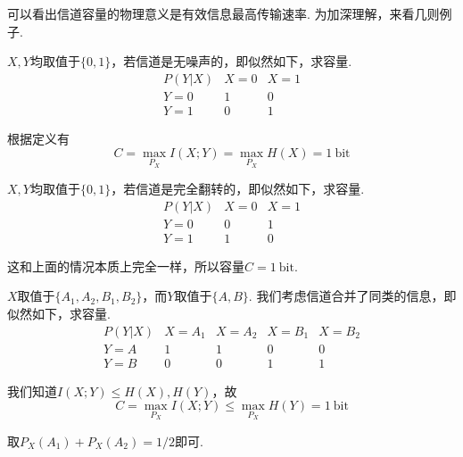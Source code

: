 可以看出信道容量的物理意义是有效信息最高传输速率. 为加深理解，来看几则例子. 
\begin{example}
    $X,Y$均取值于$\{0,1\}$，若信道是无噪声的，即似然如下，求容量.
    \[
    \begin{array}{c|c|c}
        P(Y|X) & X=0 & X=1 \\ \hline 
        Y=0 & 1 & 0 \\ \hline 
        Y=1 & 0 & 1        
    \end{array}
    \]
\end{example}
\begin{solution}根据定义有
    \[
        C = \max_{P_X} I(X;Y) = \max_{P_X} H(X) = 1 \ \text{bit}
    \]
\end{solution}

\begin{example}
    $X,Y$均取值于$\{0,1\}$，若信道是完全翻转的，即似然如下，求容量.
    \[
    \begin{array}{c|c|c}
        P(Y|X) & X=0 & X=1 \\ \hline 
        Y=0 & 0 & 1 \\ \hline 
        Y=1 & 1 & 0        
    \end{array}
    \]
\end{example}
\begin{solution}
    这和上面的情况本质上完全一样，所以容量$C=1 \ \text{bit}$. 
\end{solution}

\begin{example}
    $X$取值于$\{A_1, A_2, B_1, B_2\}$，而$Y$取值于$\{A,B\}$. 我们考虑信道合并了同类的信息，即似然如下，求容量.
    \[
    \begin{array}{c|c|c|c|c}
        P(Y|X) & X=A_1 & X=A_2 & X=B_1 & X=B_2\\ \hline 
        Y=A & 1 & 1 & 0 & 0\\ \hline 
        Y=B & 0 & 0 & 1 & 1       
    \end{array}
    \]
\end{example}
\begin{solution}
    我们知道$I(X;Y) \le H(X), H(Y)$，故 
    \[
    C = \max_{P_X} I(X;Y) \le \max_{P_X} H(Y) = 1 \ \text{bit}
    \]

    取$P_X(A_1) + P_X(A_2) = 1/2$即可.
\end{solution}

